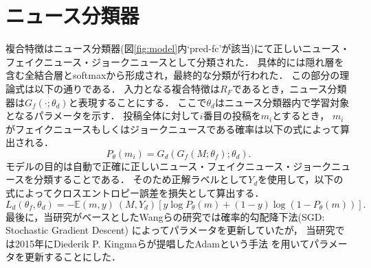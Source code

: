 \section{ニュース分類器}
%
複合特徴はニュース分類器(図\ref{fig:model}内`pred-fc'が該当)にて正しいニュース・フェイクニュース・ジョークニュースとして分類された．
具体的には隠れ層を含む全結合層とsoftmaxから形成され，最終的な分類が行われた．
この部分の理論式は以下の通りである．
入力となる複合特徴は$R_F$であるとき，ニュース分類器は$G_f(\cdot; \theta_d)$と表現することにする．
ここで$\theta_d$はニュース分類器内で学習対象となるパラメータを示す．
投稿全体に対して$i$番目の投稿を$m_i$とするとき，
$m_i$がフェイクニュースもしくはジョークニュースである確率は以下の式によって算出される．
\begin{equation}
    \label{eq:news_classify}
    P_\theta(m_i) = G_d(G_f(M; \theta_f); \theta_d).
\end{equation}
モデルの目的は自動で正確に正しいニュース・フェイクニュース・ジョークニュースを分類することである．
そのため正解ラベルとして$Y_d$を使用して，以下の式によってクロスエントロピー誤差を損失として算出する．
\begin{equation}
    \label{eq:cross_entropy}
    L_d(\theta_f, \theta_d) = -\mathbb{E}{(m,y)~(M, Y_d)}[y\log P_\theta(m) + (1-y)\log (1-P_\theta(m))].
\end{equation}
最後に，当研究がベースとしたWangらの研究では確率的勾配降下法(SGD: Stochastic Gradient Descent)
によってパラメータを更新していたが，
当研究では2015年にDiederik P. Kingmaらが提唱したAdamという手法\cite{DBLP:journals/corr/KingmaB14}
を用いてパラメータを更新することにした．
%

